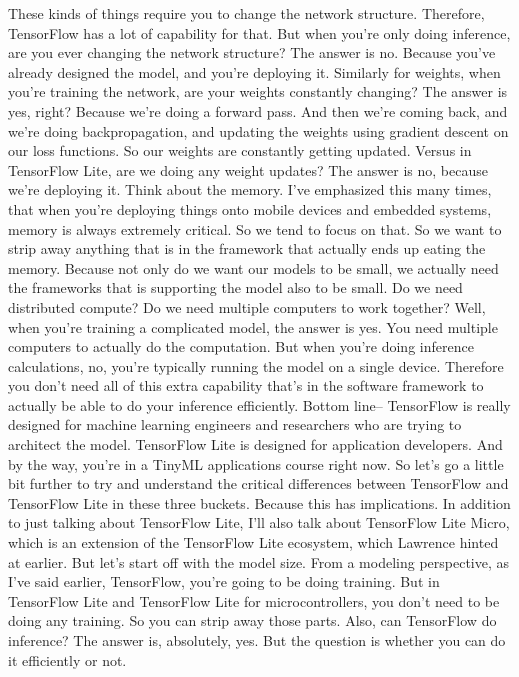 These kinds of things require you to change the network structure.
Therefore, TensorFlow has a lot of capability for that.
But when you're only doing inference, are you
ever changing the network structure?
The answer is no.
Because you've already designed the model, and you're deploying it.
Similarly for weights, when you're training the network,
are your weights constantly changing?
The answer is yes, right?
Because we're doing a forward pass.
And then we're coming back, and we're doing backpropagation,
and updating the weights using gradient descent on our loss functions.
So our weights are constantly getting updated.
Versus in TensorFlow Lite, are we doing any weight updates?
The answer is no, because we're deploying it.
Think about the memory.
I've emphasized this many times, that when you're deploying things
onto mobile devices and embedded systems,
memory is always extremely critical.
So we tend to focus on that.
So we want to strip away anything that is in the framework that
actually ends up eating the memory.
Because not only do we want our models to be small,
we actually need the frameworks that is supporting the model also to be small.
Do we need distributed compute?
Do we need multiple computers to work together?
Well, when you're training a complicated model, the answer is yes.
You need multiple computers to actually do the computation.
But when you're doing inference calculations,
no, you're typically running the model on a single device.
Therefore you don't need all of this extra capability that's
in the software framework to actually be able to do your inference efficiently.
Bottom line-- TensorFlow is really designed for machine
learning engineers and researchers who are trying to architect the model.
TensorFlow Lite is designed for application developers.
And by the way, you're in a TinyML applications course right now.
So let's go a little bit further to try and understand
the critical differences between TensorFlow and TensorFlow Lite
in these three buckets.
Because this has implications.
In addition to just talking about TensorFlow Lite,
I'll also talk about TensorFlow Lite Micro, which
is an extension of the TensorFlow Lite ecosystem, which
Lawrence hinted at earlier.
But let's start off with the model size.
From a modeling perspective, as I've said earlier, TensorFlow,
you're going to be doing training.
But in TensorFlow Lite and TensorFlow Lite for microcontrollers,
you don't need to be doing any training.
So you can strip away those parts.
Also, can TensorFlow do inference?
The answer is, absolutely, yes.
But the question is whether you can do it efficiently or not.

